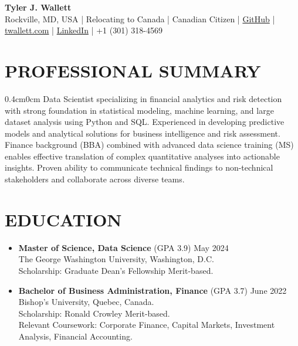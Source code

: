 \documentclass[a4paper,9pt]{extarticle}
\begin{document}
\thispagestyle{firstpage}

\begin{center}
\textbf{\Huge Tyler J. Wallett }\\[3pt] %
Rockville, MD, USA | Relocating to Canada | Canadian Citizen | \href{https://github.com/twallett}{GitHub} | \href{https://www.twallett.com}{twallett.com} | \href{https://www.linkedin.com/in/twallett/}{LinkedIn} | +1 (301) 318-4569  %
\end{center}

\section*{PROFESSIONAL SUMMARY}

\begin{adjustwidth}{0.4cm}{0cm}
Data Scientist specializing in financial analytics and risk detection with strong foundation in statistical modeling, machine learning, and large dataset analysis using Python and SQL. Experienced in developing predictive models and analytical solutions for business intelligence and risk assessment. Finance background (BBA) combined with advanced data science training (MS) enables effective translation of complex quantitative analyses into actionable insights. Proven ability to communicate technical findings to non-technical stakeholders and collaborate across diverse teams.
\end{adjustwidth}


\section*{EDUCATION}

\begin{itemize}[leftmargin=0.4cm, label={}]
    \item \textbf{Master of Science, Data Science} (GPA 3.9) \hfill May 2024 \\ 
    The George Washington University, Washington, D.C. \\ 
    Scholarship: Graduate Dean's Fellowship Merit-based.
\end{itemize}

\noindent
\begin{itemize}[leftmargin=0.4cm, label={}]
    \item \textbf{Bachelor of Business Administration, Finance} (GPA 3.7) \hfill June 2022 \\
    Bishop's University, Quebec, Canada. \\ 
    Scholarship: Ronald Crowley Merit-based. \\
    Relevant Coursework: Corporate Finance, Capital Markets, Investment Analysis, Financial Accounting.
\end{itemize}
\end{document}
